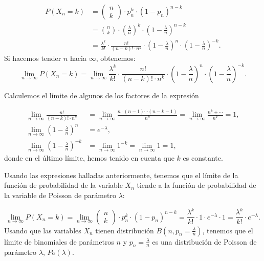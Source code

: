 \documentclass[]{book}
\begin{document}
\[
\begin{array}{rl}
P(X_n=k)&=\left(\begin{array}{c} n\\ k\end{array}\right) \cdot p_n^k\cdot  (1-p_n)^{n-k}
\\
&= {n\choose k}\cdot \left(\frac{\lambda}{n}\right)^{k}\cdot \left(1-\frac{\lambda}{n}\right)^{n-k}\\
&=
\frac{\lambda^k}{k!}\cdot\frac{n!}{(n-k)!\cdot n^k}\cdot
\left(1-\frac{\lambda}{n}\right)^{n}\cdot \left(1-\frac{\lambda}{n}\right)^{-k}.
\end{array}
\]
Si hacemos tender \(n\) hacia \(\infty\), obtenemos:
\[
\displaystyle\lim_{n\to \infty} P(X_n=k) = \lim_{n\to \infty} \frac{\lambda^k}{k!}\cdot\frac{n!}{(n-k)!\cdot n^k} \cdot
\left(1-\frac{\lambda}{n}\right)^{n}\cdot \left(1-\frac{\lambda}{n}\right)^{-k}.
\]

Calculemos el límite de algunos de los factores de la expresión

\[
\begin{array}{rl}
\lim\limits_{n\to \infty}\frac{n!}{(n-k)!\cdot n^k} & = \lim\limits_{n\to \infty}\frac{n\cdot (n-1)\cdots (n-k-1)}{n^k}
=\lim\limits_{n\to \infty}\frac{n^{k}+\cdots}{n^k}=1, \\
\lim\limits_{n\to \infty} \left(1-\frac{\lambda}{n}\right)^{n} & =e^{-\lambda},\\
\lim\limits_{n\to \infty} \left(1-\frac{\lambda}{n}\right)^{-k} & =\lim\limits_{n\to \infty} 1^{-k}=\lim\limits_{n\to \infty}  1=1,
\end{array}
\]
donde en el último límite, hemos tenido en cuenta que \(k\) es constante.

Usando las expresiones halladas anteriormente, tenemos que el límite de la función de probabilidad de la variable \(X_n\) tiende a la función de probabilidad de la variable de Poisson de parámetro \(\lambda\):

\[
\displaystyle\lim_{n\to\infty} P(X_n=k)=
\lim_{n\to\infty} \left(\begin{array}{c} n\\ k\end{array}\right)
\cdot p_n^k \cdot (1-p_n)^{n-k}= \frac{\lambda^k}{k!}\cdot 1 \cdot e^{-\lambda}\cdot 1=\frac{\lambda^k}{k!}\cdot e^{-\lambda}.
\]
Usando que las variables \(X_n\) tienen distribución \(B(n,p_n=\frac{\lambda}{n})\), tenemos que el límite de binomiales de parámetros \(n\) y \(p_n=\frac{\lambda}{n}\) es una distribución de Poisson de parámetro \(\lambda\), \(Po(\lambda)\).
\end{document}
